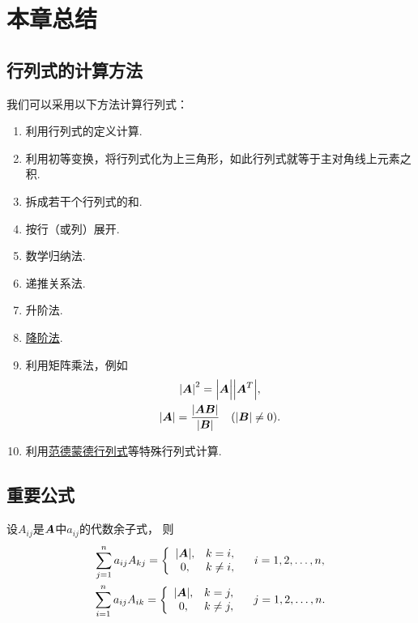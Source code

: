 \section{本章总结}
\subsection*{行列式的计算方法}
我们可以采用以下方法计算行列式：
\begin{enumerate}
	\item 利用行列式的定义计算.
	\item 利用初等变换，将行列式化为上三角形，如此行列式就等于主对角线上元素之积.
	\item 拆成若干个行列式的和.
	\item 按行（或列）展开.
	\item 数学归纳法.
	\item 递推关系法.
	\item 升阶法.
	\item \hyperref[theorem:逆矩阵.行列式降阶定理]{降阶法}.
	\item 利用矩阵乘法，例如\begin{gather*}
		\abs{\vb{A}}^2 = \abs{\vb{A}\vphantom{\vb{A}^T}} \abs{\vb{A}^T}, \\
		\abs{\vb{A}} = \frac{\abs{\vb{A} \vb{B}}}{\abs{\vb{B}}} \quad(\abs{\vb{B}}\neq0).
	\end{gather*}
	\item 利用\hyperref[equation:行列式.范德蒙德行列式]{范德蒙德行列式}等特殊行列式计算.
\end{enumerate}

\subsection*{重要公式}
设\(A_{ij}\)是\(\boldsymbol{A}\)中\(a_{ij}\)的代数余子式，
则\begin{gather*}
	\sum_{j=1}^n a_{ij} A_{kj}
	= \left\{ \begin{array}{cl}
		\abs{\boldsymbol{A}}, & k = i, \\
		0, & k \neq i,
	\end{array} \right.
	\quad i=1,2,\dotsc,n, \\
	\sum_{i=1}^n a_{ij} A_{ik}
	= \left\{ \begin{array}{cl}
		\abs{\boldsymbol{A}}, & k = j, \\
		0, & k \neq j,
	\end{array} \right.
	\quad j=1,2,\dotsc,n.
\end{gather*}

